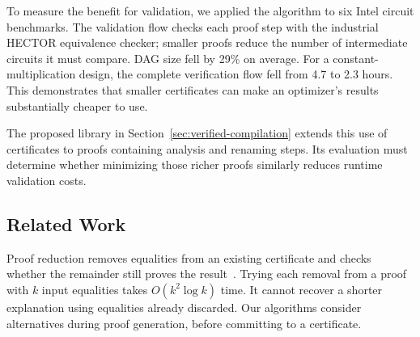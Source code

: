 To measure the benefit for validation, we applied the algorithm to six Intel circuit benchmarks.
The validation flow checks each proof step with the industrial HECTOR equivalence checker;
  smaller proofs reduce the number of intermediate circuits it must compare.
DAG size fell by 29\% on average.
For a constant-multiplication design, the complete verification flow fell from 4.7 to 2.3 hours.
This demonstrates that smaller certificates can make an optimizer's results substantially cheaper to use.

The proposed library in Section~\ref{sec:verified-compilation} extends this use of certificates
  to proofs containing analysis and renaming steps.
Its evaluation must determine whether minimizing those richer proofs
  similarly reduces runtime validation costs.

\subsection{Related Work}
\label{sec:proofs-related-work}

Proof reduction removes equalities from an existing certificate
  and checks whether the remainder still proves the result~\cite{pp-congr}.
Trying each removal from a proof with $k$ input equalities takes $O(k^2\log k)$ time.
It cannot recover a shorter explanation using equalities already discarded.
Our algorithms consider alternatives during proof generation, before committing to a certificate.

